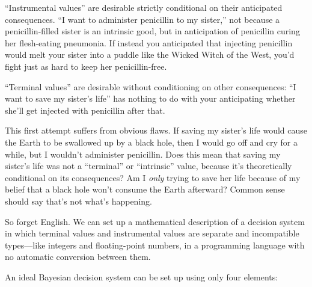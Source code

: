 {
 ``Instrumental values'' are
desirable strictly conditional on their anticipated consequences.
``I want to administer penicillin to my
sister,'' not because a penicillin-filled sister is
an intrinsic good, but in anticipation of penicillin curing her
flesh-eating pneumonia. If instead you anticipated that injecting
penicillin would melt your sister into a puddle like the Wicked Witch
of the West, you'd fight just as hard to keep her
penicillin-free.}

{
 ``Terminal values'' are
desirable without conditioning on other consequences:
``I want to save my sister's
life'' has nothing to do with your anticipating
whether she'll get injected with penicillin after
that.}

{
 This first attempt suffers from obvious flaws. If saving my
sister's life would cause the Earth to be swallowed up
by a black hole, then I would go off and cry for a while, but I
wouldn't administer penicillin. Does this mean that
saving my sister's life was not a
``terminal'' or
``intrinsic'' value, because
it's theoretically conditional on its consequences? Am
I \textit{only} trying to save her life because of my belief that a
black hole won't consume the Earth afterward? Common
sense should say that's not what's
happening.}

{
 So forget English. We can set up a mathematical description of a
decision system in which terminal values and instrumental values are
separate and incompatible types---like integers and floating-point
numbers, in a programming language with no automatic conversion between
them.}

{
 An ideal Bayesian decision system can be set up using only four
elements:}


